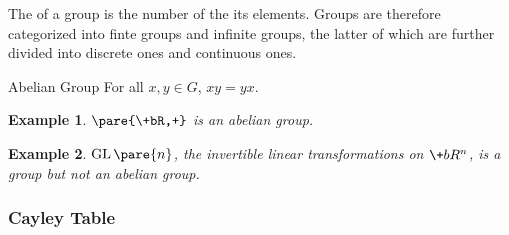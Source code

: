 \documentclass[hidelinks]{article}
\newtheorem{example}{Example}
\DeclareMathOperator{\GL}{GL}
\begin{document}
The  of a group is the number of the its elements. Groups are therefore categorized into finte groups and infinite groups, the latter of which are further divided into discrete ones and continuous ones.
\begin{termdef}{Abelian Group}
    For all $x,y \in G$, $xy = yx$.
\end{termdef}
\begin{sample}
    \begin{example}
        $\pare{\+bR,+}$ is an abelian group.
    \end{example}
\end{sample}
\begin{sample}
    \begin{example}
        $\GL\pare{n}$, the invertible linear transformations on $\+bR^n$, is a group but not an abelian group.
    \end{example}
\end{sample}


\subsubsection{Cayley Table} %
\label{ssub:cayley_table}
\end{document}
